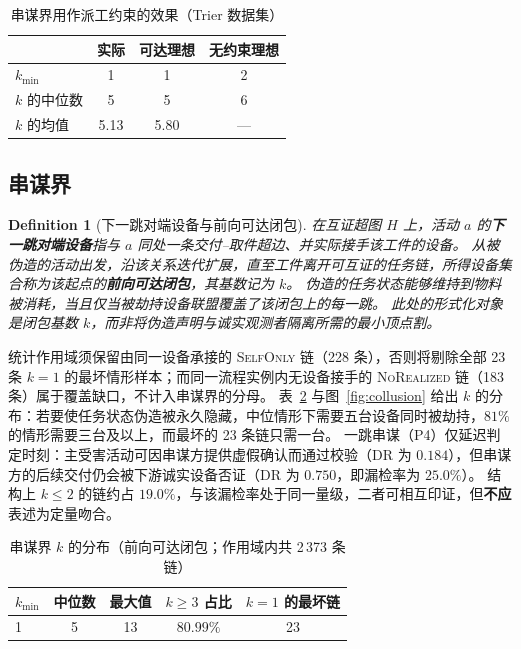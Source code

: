 \documentclass[manuscript,screen,review]{acmart}
\newtheorem{definition}{Definition}
\begin{document}
\begin{table}[t]
  \centering
  \caption{串谋界用作派工约束的效果（Trier 数据集）}
  \label{tab:dispatch}
  \begin{tabular}{@{}lccc@{}}
    \toprule
     & 实际 & 可达理想 & 无约束理想 \\
    \midrule
    $k_{\min}$ & 1 & 1 & 2 \\
    $k$ 的中位数 & 5 & 5 & 6 \\
    $k$ 的均值 & 5.13 & 5.80 & --- \\
    \bottomrule
  \end{tabular}
\end{table}

\subsection{串谋界}
\label{sec:collusion}

\begin{definition}[下一跳对端设备与前向可达闭包]
\label{def:closure}
在互证超图 $H$ 上，活动 $a$ 的\textbf{下一跳对端设备}指与 $a$ 同处一条交付--取件超边、并实际接手该工件的设备。
从被伪造的活动出发，沿该关系迭代扩展，直至工件离开可互证的任务链，所得设备集合称为该起点的\textbf{前向可达闭包}，其基数记为 $k$。
伪造的任务状态能够维持到物料被消耗，当且仅当被劫持设备联盟覆盖了该闭包上的每一跳。
此处的形式化对象是闭包基数 $k$，而非将伪造声明与诚实观测者隔离所需的最小顶点割。
\end{definition}

统计作用域须保留由同一设备承接的 \textsc{SelfOnly} 链（228 条），否则将剔除全部 23 条 $k{=}1$ 的最坏情形样本；而同一流程实例内无设备接手的 \textsc{NoRealized} 链（183 条）属于覆盖缺口，不计入串谋界的分母。
表~\ref{tab:kdist} 与图~\ref{fig:collusion} 给出 $k$ 的分布：若要使任务状态伪造被永久隐藏，中位情形下需要五台设备同时被劫持，$81\%$ 的情形需要三台及以上，而最坏的 23 条链只需一台。
一跳串谋（P4）仅延迟判定时刻：主受害活动可因串谋方提供虚假确认而通过校验（DR 为 $0.184$），但串谋方的后续交付仍会被下游诚实设备否证（DR 为 $0.750$，即漏检率为 $25.0\%$）。
结构上 $k\le 2$ 的链约占 $19.0\%$，与该漏检率处于同一量级，二者可相互印证，但\textbf{不应}表述为定量吻合。

\begin{table}[t]
  \centering
  \caption{串谋界 $k$ 的分布（前向可达闭包；作用域内共 2\,373 条链）}
  \label{tab:kdist}
  \begin{tabular}{@{}lcccc@{}}
    \toprule
    $k_{\min}$ & 中位数 & 最大值 & $k\ge 3$ 占比 & $k{=}1$ 的最坏链 \\
    \midrule
    1 & 5 & 13 & $80.99\%$ & 23 \\
    \bottomrule
  \end{tabular}
\end{table}
\end{document}
